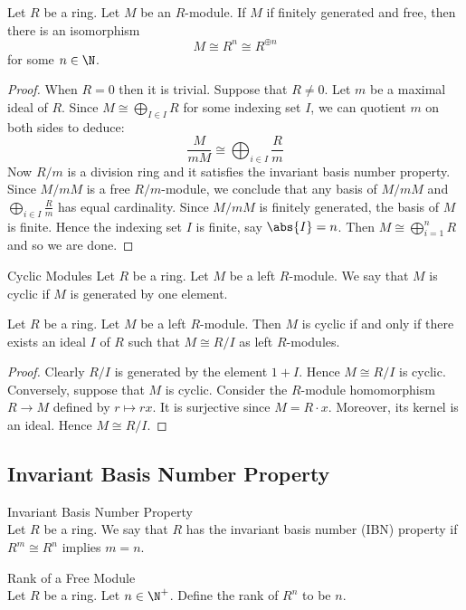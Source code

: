 \documentclass[a4paper]{article}
\begin{document}
\begin{prp}{}{} Let $R$ be a ring. Let $M$ be an $R$-module. If $M$ if finitely generated and free, then there is an isomorphism $$M\cong R^n\cong R^{\oplus n}$$ for some $n\in\N$. 
\begin{proof}
When $R=0$ then it is trivial. Suppose that $R\neq 0$. Let $m$ be a maximal ideal of $R$. Since $M\cong\bigoplus_{I\in I}R$ for some indexing set $I$, we can quotient $m$ on both sides to deduce: $$\frac{M}{mM}\cong\bigoplus_{i\in I}\frac{R}{m}$$ Now $R/m$ is a division ring and it satisfies the invariant basis number property. Since $M/mM$ is a free $R/m$-module, we conclude that any basis of $M/mM$ and $\bigoplus_{i\in I}\frac{R}{m}$ has equal cardinality. Since $M/mM$ is finitely generated, the basis of $M$ is finite. Hence the indexing set $I$ is finite, say $\abs{I}=n$. Then $M\cong\bigoplus_{i=1}^nR$ and so we are done. 
\end{proof}
\end{prp}

\begin{defn}{Cyclic Modules}{} Let $R$ be a ring. Let $M$ be a left $R$-module. We say that $M$ is cyclic if $M$ is generated by one element. 
\end{defn}

\begin{lmm}{}{} Let $R$ be a ring. Let $M$ be a left $R$-module. Then $M$ is cyclic if and only if there exists an ideal $I$ of $R$ such that $M\cong R/I$ as left $R$-modules. 
\begin{proof}
Clearly $R/I$ is generated by the element $1+I$. Hence $M\cong R/I$ is cyclic. Conversely, suppose that $M$ is cyclic. Consider the $R$-module homomorphism $R\to M$ defined by $r\mapsto rx$. It is surjective since $M=R\cdot x$. Moreover, its kernel is an ideal. Hence $M\cong R/I$. 
\end{proof}
\end{lmm}

\subsection{Invariant Basis Number Property}
\begin{defn}{Invariant Basis Number Property}{}\\
Let $R$ be a ring. We say that $R$ has the invariant basis number (IBN) property if $R^m\cong R^n$ implies $m=n$. 
\end{defn}

\begin{defn}{Rank of a Free Module}{}\\
Let $R$ be a ring. Let $n\in\N^+$. Define the rank of $R^n$ to be $n$. 
\end{defn}
\end{document}
